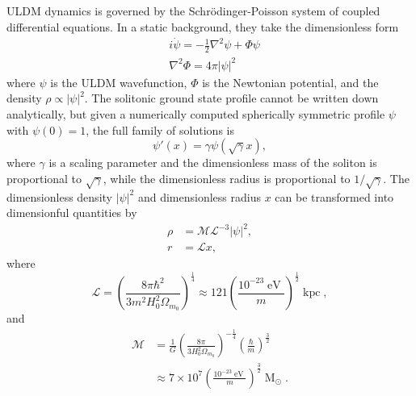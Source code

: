 \documentclass{pasa}%
\begin{document}
ULDM dynamics is governed by the Schr{\"o}dinger-Poisson system of coupled differential equations. In a static background, they take the dimensionless form  
%
\begin{align}
    &i\dot{\psi} = -\frac{1}{2}\nabla^2\psi+\Phi\psi \\
    &\nabla^2\Phi = 4\pi \vert \psi\vert^2
\end{align}
%
where $\psi$ is the ULDM wavefunction, $\Phi$ is the Newtonian potential, and the density $\rho \propto |\psi|^2$. The solitonic ground state profile cannot be written down analytically, but given a numerically computed spherically symmetric  profile $\psi$ with $\psi(0)=1$, the full family of solutions is
%
\begin{equation}
    \psi'(x) = \gamma\psi(\sqrt{\gamma}x),
\end{equation}
%
where $\gamma$ is a scaling parameter and the dimensionless mass of the soliton is proportional to $\sqrt{\gamma}$, while the dimensionless radius is proportional to $1/\sqrt{\gamma}$. The dimensionless density $\vert\psi\vert^2$ and dimensionless radius $x$ can be transformed into dimensionful quantities by
\begin{align}
    \rho &= \mathcal{M}\mathcal{L}^{-3}\vert\psi\vert^2, \label{eq:density_conv} \\
    r &= \mathcal{L}x, \label{eq:mass_conv}
\end{align}
where
\begin{equation}\label{eq:length}
    \mathcal{L}=\left(\frac{8\pi\hbar^2}{3 m^2H_0^2\Omega_{m_0}}\right)^{\frac{1}{4}}\approx121\left(\frac{10^{-23}\operatorname{eV}}{m}\right)^{\frac{1}{2}}\operatorname{kpc},
\end{equation}
%
and 
%
\begin{align}\label{eq:mass}
    \mathcal{M}&=\frac{1}{G}\left(\frac{8\pi}{3 H_0^2\Omega_{m_0}}\right)^{-\frac{1}{4}}\left(\frac{\hbar}{m}\right)^{\frac{3}{2}}\nonumber\\
    &\approx 7\times 10^7\left(\frac{10^{-23}\operatorname{eV}}{m}\right)^{\frac{3}{2}}\operatorname{M}_{\odot}.
\end{align}
\end{document}
